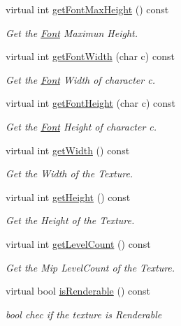 \begin{DoxyCompactItemize}
\item 
virtual int \hyperlink{class_magnum_1_1_font_1_1_resource_a9ed0ec2b641669c43a7b56ea134d91ee}{get\+Font\+Max\+Height} () const 
\begin{DoxyCompactList}\small\item\em Get the \hyperlink{class_magnum_1_1_font}{Font} Maximun Height. \end{DoxyCompactList}\item 
virtual int \hyperlink{class_magnum_1_1_font_1_1_resource_a40a57d4dd7ca245a095bc66eba41c6d4}{get\+Font\+Width} (char c) const 
\begin{DoxyCompactList}\small\item\em Get the \hyperlink{class_magnum_1_1_font}{Font} Width of character c. \end{DoxyCompactList}\item 
virtual int \hyperlink{class_magnum_1_1_font_1_1_resource_a70b6f82e7077ff077da17efcb1e695f2}{get\+Font\+Height} (char c) const 
\begin{DoxyCompactList}\small\item\em Get the \hyperlink{class_magnum_1_1_font}{Font} Height of character c. \end{DoxyCompactList}\item 
virtual int \hyperlink{class_magnum_1_1_font_1_1_resource_a951366d066e4535178207445e998c93e}{get\+Width} () const 
\begin{DoxyCompactList}\small\item\em Get the Width of the Texture. \end{DoxyCompactList}\item 
virtual int \hyperlink{class_magnum_1_1_font_1_1_resource_aa1176dbf8da1bc685e7abfca42e50ab7}{get\+Height} () const 
\begin{DoxyCompactList}\small\item\em Get the Height of the Texture. \end{DoxyCompactList}\item 
virtual int \hyperlink{class_magnum_1_1_font_1_1_resource_af69f8152d18bffc60798701734e5bd33}{get\+Level\+Count} () const 
\begin{DoxyCompactList}\small\item\em Get the Mip Level\+Count of the Texture. \end{DoxyCompactList}\item 
virtual bool \hyperlink{class_magnum_1_1_font_1_1_resource_aa7a25ef59fdf2f5a96543a309474866f}{is\+Renderable} () const 
\begin{DoxyCompactList}\small\item\em bool chec if the texture is Renderable \end{DoxyCompactList}\item 

\end{DoxyCompactItemize}
